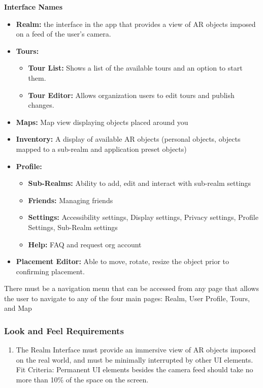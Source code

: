 \documentclass{article}
\begin{document}
\textbf{Interface Names}
\begin{itemize}
    \item \textbf{Realm:} the interface in the app that provides a view of AR objects imposed on a feed of the user’s camera.
    \item \textbf{Tours:}
          \begin{itemize}
              \item \textbf{Tour List:} Shows a list of the available tours and an option to start them.
              \item \textbf{Tour Editor:} Allows organization users to edit tours and publish changes.
          \end{itemize}
    \item \textbf{Maps:} Map view displaying objects placed around you
    \item \textbf{Inventory:} A display of available AR objects (personal objects, objects mapped to a sub-realm and application preset objects)
    \item \textbf{Profile:}
          \begin{itemize}
              \item \textbf{Sub-Realms:} Ability to add, edit and interact with sub-realm settings
              \item \textbf{Friends:} Managing friends
              \item \textbf{Settings:} Accessibility settings, Display settings, Privacy settings, Profile Settings, Sub-Realm settings
              \item \textbf{Help:} FAQ and request org account
          \end{itemize}
    \item \textbf{Placement Editor:} Able to move, rotate, resize the object prior to confirming placement.
\end{itemize}

There must be a navigation menu that can be accessed from any page that allows the user to navigate to any of the four main pages: Realm, User Profile, Tours, and Map

\subsubsection{Look and Feel Requirements}



\begin{enumerate}[align=left, label=\textbf{EI-LF\arabic*:}]
    \item The Realm Interface must provide an immersive view of AR objects imposed on the real world, and must be minimally interrupted by other UI elements. \\
          Fit Criteria: Permanent UI elements besides the camera feed should take no more than 10\% of the space on the screen. \\

\end{enumerate}
\end{document}
